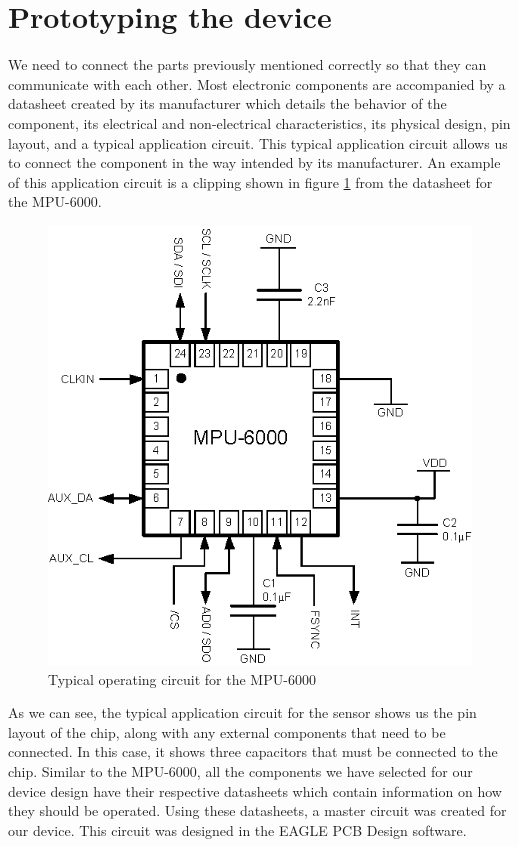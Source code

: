 \section{Prototyping the device}
\label{Chap:Prototype}
We need to connect the parts previously mentioned correctly so that they can communicate with each other.
Most electronic components are accompanied by a datasheet created by its manufacturer
which details the behavior of the component,
its electrical and non-electrical characteristics,
its physical design,
pin layout,
and a typical application circuit.
This typical application circuit allows us to connect the component in the way intended by its manufacturer.
An example of this application circuit is a clipping shown in figure \ref{Fig:MPUAppCircuit} from the datasheet \cite{Datasheet:MPU6000} for the MPU-6000.
\begin{figure}
\begin{center}
\includegraphics{images/MPU600OpCircuit.eps}
\caption{Typical operating circuit for the MPU-6000}
\label{Fig:MPUAppCircuit}
\end{center}
\end{figure}
As we can see,
the typical application circuit for the sensor shows us the pin layout of the chip,
along with any external components that need to be connected.
In this case, it shows three capacitors that must be connected to the chip.
Similar to the MPU-6000,
all the components we have selected for our device design have their respective datasheets which contain information on how they should be operated.
Using these datasheets,
a master circuit was created for our device.
This circuit was designed in the EAGLE PCB Design software.


